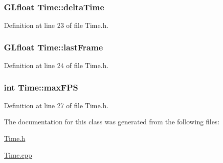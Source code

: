 \hypertarget{class_time_a7dd93631e77477e08954476b0f56f013}{}
\subsubsection[{delta\+Time}]{\setlength{\rightskip}{0pt plus 5cm}G\+Lfloat Time\+::delta\+Time}\label{class_time_a7dd93631e77477e08954476b0f56f013}


Definition at line 23 of file Time.\+h.

\hypertarget{class_time_adda8e3dcf090474f66b60ba354843270}{}
\subsubsection[{last\+Frame}]{\setlength{\rightskip}{0pt plus 5cm}G\+Lfloat Time\+::last\+Frame}\label{class_time_adda8e3dcf090474f66b60ba354843270}


Definition at line 24 of file Time.\+h.

\hypertarget{class_time_a1ea63396edff67d5069ab9dd2e8f3c44}{}
\subsubsection[{max\+F\+P\+S}]{\setlength{\rightskip}{0pt plus 5cm}int Time\+::max\+F\+P\+S}\label{class_time_a1ea63396edff67d5069ab9dd2e8f3c44}


Definition at line 27 of file Time.\+h.



The documentation for this class was generated from the following files\+:\begin{DoxyCompactItemize}
\item 
\hyperlink{_time_8h}{Time.\+h}\item 
\hyperlink{_time_8cpp}{Time.\+cpp}\end{DoxyCompactItemize}
